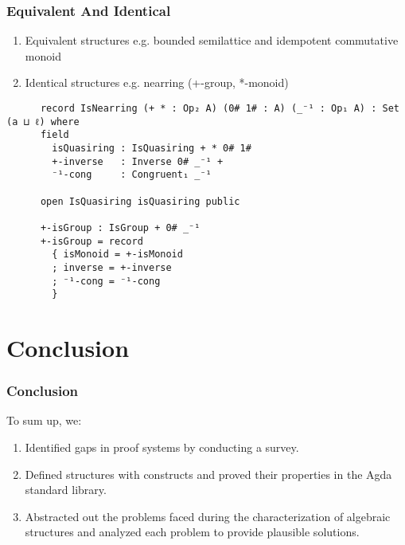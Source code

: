 \documentclass[xcolor={dvipsnames}]{beamer}
\begin{document}

\begin{frame}[fragile]
  \frametitle{Equivalent And Identical}
  \begin{enumerate} 
    \item Equivalent structures e.g. bounded semilattice and idempotent commutative monoid
    \item Identical structures e.g. nearring (+-group, *-monoid)
  \end{enumerate}

    \begin{verbatim}
      record IsNearring (+ * : Op₂ A) (0# 1# : A) (_⁻¹ : Op₁ A) : Set (a ⊔ ℓ) where
      field
        isQuasiring : IsQuasiring + * 0# 1#
        +-inverse   : Inverse 0# _⁻¹ +
        ⁻¹-cong     : Congruent₁ _⁻¹
      
      open IsQuasiring isQuasiring public

      +-isGroup : IsGroup + 0# _⁻¹
      +-isGroup = record 
        { isMonoid = +-isMonoid 
        ; inverse = +-inverse 
        ; ⁻¹-cong = ⁻¹-cong 
        }
    \end{verbatim}
\end{frame}


\section{Conclusion}

\begin{frame}
  \frametitle{Conclusion}

  To sum up, we:
  \begin{enumerate}
    \item Identified gaps in proof systems by conducting a survey.
    \item Defined structures with constructs and proved their properties in
    the Agda standard library.
    \item Abstracted out the problems faced during the characterization of
    algebraic structures and analyzed each problem to provide plausible
    solutions.
  \end{enumerate}
\end{frame}
\end{document}
